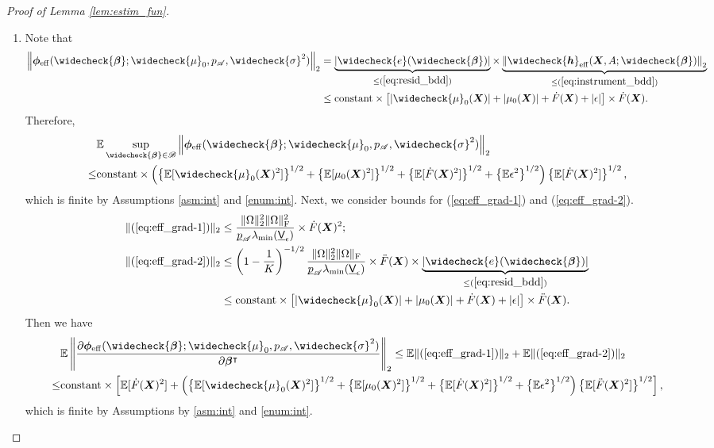 \documentclass[11pt]{article}
\numberwithin{equation}{section}
\theoremstyle{definition}
\theoremstyle{remark}
\newcommand{\bh}{\bm{h}}
\newcommand{\bX}{\bm{X}}
\newcommand{\bbeta}{\bm{\beta}}
\newcommand{\bphi}{\bm{\phi}}
\newcommand{\bbE}{\mathbb{E}}
\newcommand{\sA}{\mathscr{A}}
\newcommand{\sB}{\mathscr{B}}
\newcommand{\sfV}{\mathsf{V}}
\def\ubar#1{\underbar{$ #1 $}}
\newcommand{\eff}{\mathrm{eff}}
\begin{document}
\begin{proof}[Proof of Lemma \ref{lem:estim_fun}]
\begin{enumerate}[label=(\Roman*),leftmargin=0cm]
		\item Note that
		\begin{align*}
			\left\| \bphi_{\eff}(\widecheck{\bbeta};\widecheck{\mu}_{0},p_{\sA},\widecheck{\sigma}^{2}) \right\|_{2} &= \underbrace{\left| \widecheck{e}(\widecheck{\bbeta}) \right|}_{\le (\ref{eq:resid_bdd})}\times
			\underbrace{\left\| \widecheck{\bh}_{\eff}(\bX,A;\widecheck{\bbeta}) \right\|_{2}}_{\le (\ref{eq:instrument_bdd})}\\
			&\le \text{constant} \times \left[  |\widecheck{\mu}_{0}(\bX)| + |\mu_{0}(\bX)| + \dot{F}(\bX) + |\epsilon| \right] \times \dot{F}(\bX).
		\end{align*}
		Therefore,
		\begin{align*}
			&\bbE\sup_{\widecheck{\bbeta} \in \sB}\left\| \bphi_{\eff}(\widecheck{\bbeta};\widecheck{\mu}_{0},p_{\sA},\widecheck{\sigma}^{2}) \right\|_{2} \\
			\le& \text{constant} \times \left(  \left\{ \bbE[\widecheck{\mu}_{0}(\bX)^{2}] \right\}^{1/2} + \left\{ \bbE[\mu_{0}(\bX)^{2}] \right\}^{1/2} + \left\{ \bbE[\dot{F}(\bX)^{2}] \right\}^{1/2} + \left\{ \bbE \epsilon^{2} \right\}^{1/2} \right) \left\{ \bbE[\dot{F}(\bX)^{2}] \right\}^{1/2},
		\end{align*}
		which is finite by Assumptions \ref{asm:int} and \ref{enum:int}. Next, we consider bounds for (\ref{eq:eff_grad-1}) and (\ref{eq:eff_grad-2}).
		\begin{align*}
			\| (\ref{eq:eff_grad-1}) \|_{2} &\le {\| \Omega \|_{2}^{2}\| \Omega \|_{\rm F}^{2} \over \ubar{p}_{\sA}\lambda_{\min}(\ubar{\sfV}_{\epsilon})}\times \dot{F}(\bX)^{2};\\
			\| (\ref{eq:eff_grad-2}) \|_{2}
			&\le \left( 1 - {1 \over K} \right)^{-1/2}{\| \Omega \|_{2}^{2}\| \Omega \|_{\rm F} \over \ubar{p}_{\sA}\lambda_{\min}(\ubar{\sfV}_{\epsilon})}\times \ddot{F}(\bX) \times \underbrace{\left| \widecheck{e}(\widecheck{\bbeta}) \right|}_{\le (\ref{eq:resid_bdd})}\\
			&\le \text{constant} \times \left[ |\widecheck{\mu}_{0}(\bX)| + |\mu_{0}(\bX)| + \dot{F}(\bX) + |\epsilon| \right] \times \ddot{F}(\bX).
		\end{align*}
		Then we have
		\begin{align*}
			&\bbE\left\| {\partial \bphi_{\eff}(\widecheck{\bbeta};\widecheck{\mu}_{0},p_{\sA},\widecheck{\sigma}^{2}) \over \partial \bbeta^{\intercal}} \right\|_{2} \le \bbE\| (\ref{eq:eff_grad-1}) \|_{2} + \bbE\| (\ref{eq:eff_grad-2}) \|_{2}\\
			\le& \text{constant} \times \left [\bbE[\dot{F}(\bX)^{2}] + \left(  \left\{ \bbE[\widecheck{\mu}_{0}(\bX)^{2}] \right\}^{1/2} + \left\{ \bbE[\mu_{0}(\bX)^{2}] \right\}^{1/2} + \left\{ \bbE[\dot{F}(\bX)^{2}] \right\}^{1/2} + \left\{ \bbE \epsilon^{2} \right\}^{1/2} \right) \left\{ \bbE[\ddot{F}(\bX)^{2}] \right\}^{1/2}\right ],
		\end{align*}
		which is finite by Assumptions by \ref{asm:int} and \ref{enum:int}.
	\end{enumerate}
\end{proof}
\end{document}
